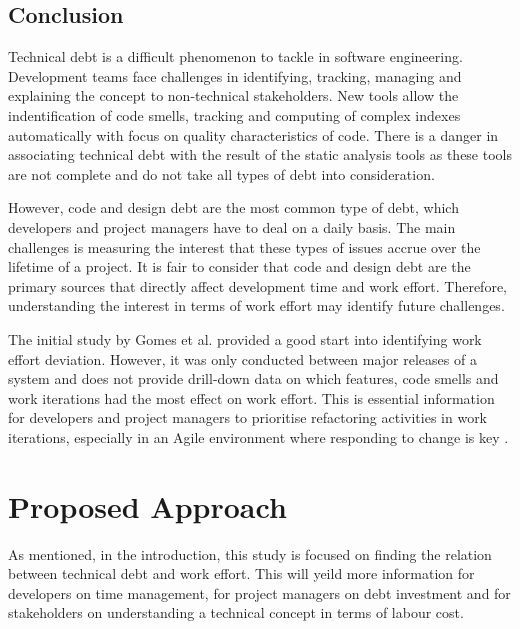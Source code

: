 \documentclass{mprop}
\begin{document}
\subsection{Conclusion}

Technical debt is a difficult phenomenon to tackle in software engineering.
Development teams face challenges in identifying, tracking, managing and
explaining the concept to non-technical stakeholders. New tools allow the
indentification of code smells, tracking and computing of complex indexes
automatically with focus on quality characteristics of code. There is a danger
in associating technical debt with the result of the static analysis tools as
these tools are not complete and do not take all types of debt into
consideration.

However, code and design debt are the most common type of debt, which developers
and project managers have to deal on a daily basis. The main challenges is
measuring the interest that these types of issues accrue over the lifetime of a
project. It is fair to consider that code and design debt are the primary
sources that directly affect development time and work effort. Therefore,
understanding the interest in terms of work effort may identify future
challenges.

The initial study by Gomes et al. \cite{Gomes2011} provided a good start into
identifying work effort deviation. However, it was only conducted between major
releases of a system and does not provide drill-down data on which features,
code smells and work iterations had the most effect on work effort. This is
essential information for developers and project managers to prioritise
refactoring activities in work iterations, especially in an Agile environment
where responding to change is key \cite{agile-manifesto}.  

\section{Proposed Approach}
\label{proposed-work}

As mentioned, in the introduction, this study is focused on finding the relation
between technical debt and work effort. This will yeild more information for
developers on time management, for project managers on debt investment and for
stakeholders on understanding a technical concept in terms of labour cost.
\end{document}
